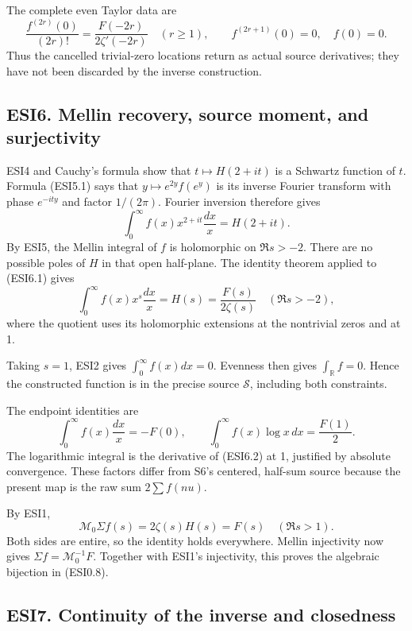 The complete even Taylor data are \[
\boxed{\frac{f^{(2r)}(0)}{(2r)!}
=\frac{F(-2r)}{2\zeta'(-2r)}\quad(r\ge1),}
\qquad f^{(2r+1)}(0)=0,
\quad f(0)=0.
\tag{ESI5.7}
\] Thus the cancelled trivial-zero locations return as actual source
derivatives; they have not been discarded by the inverse construction.

\subsection{ESI6. Mellin recovery, source moment, and
surjectivity}\label{esi6.-mellin-recovery-source-moment-and-surjectivity}

ESI4 and Cauchy's formula show that \(t\mapsto H(2+it)\) is a Schwartz
function of \(t\). Formula (ESI5.1) says that \(y\mapsto e^{2y}f(e^y)\)
is its inverse Fourier transform with phase \(e^{-ity}\) and factor
\(1/(2\pi)\). Fourier inversion therefore gives \[
\int_0^\infty f(x)x^{2+it}\frac{dx}{x}=H(2+it).
\tag{ESI6.1}
\] By ESI5, the Mellin integral of \(f\) is holomorphic on \(\Re s>-2\).
There are no possible poles of \(H\) in that open half-plane. The
identity theorem applied to (ESI6.1) gives \[
\int_0^\infty f(x)x^s\frac{dx}{x}=H(s)
=\frac{F(s)}{2\zeta(s)}\quad(\Re s>-2),
\tag{ESI6.2}
\] where the quotient uses its holomorphic extensions at the nontrivial
zeros and at 1.

Taking \(s=1\), ESI2 gives \(\int_0^\infty f(x)dx=0\). Evenness then
gives \(\int_{\mathbb R}f=0\). Hence the constructed function is in the
precise source \(\mathcal S\), including both constraints.

The endpoint identities are \[
\int_0^\infty f(x)\frac{dx}{x}=-F(0),
\qquad
\int_0^\infty f(x)\log x\,dx=\frac{F(1)}2.
\tag{ESI6.3}
\] The logarithmic integral is the derivative of (ESI6.2) at 1,
justified by absolute convergence. These factors differ from S6's
centered, half-sum source because the present map is the raw sum
\(2\sum f(nu)\).

By ESI1, \[
\mathcal M_0\Sigma f(s)=2\zeta(s)H(s)=F(s)
\quad(\Re s>1).
\tag{ESI6.4}
\] Both sides are entire, so the identity holds everywhere. Mellin
injectivity now gives \(\Sigma f=\mathcal M_0^{-1}F\). Together with
ESI1's injectivity, this proves the algebraic bijection in (ESI0.8).

\subsection{ESI7. Continuity of the inverse and
closedness}\label{esi7.-continuity-of-the-inverse-and-closedness}

